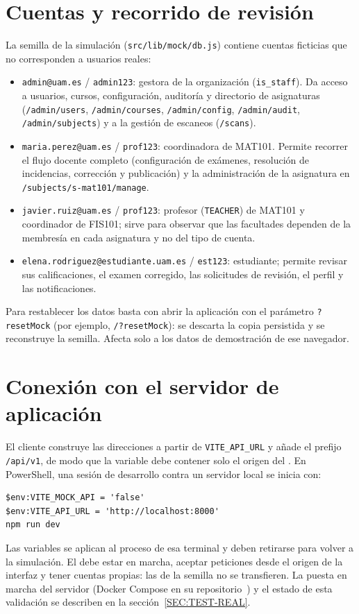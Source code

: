 \section*{Cuentas y recorrido de revisión}
La semilla de la simulación (\texttt{src/lib/mock/db.js}) contiene cuentas
ficticias que no corresponden a usuarios reales:
\begin{itemize}
  \item \texttt{admin@uam.es} / \texttt{admin123}: gestora de la organización
        (\texttt{is\_staff}). Da acceso a usuarios, cursos, configuración,
        auditoría y directorio de asignaturas (\texttt{/admin/users},
        \texttt{/admin/courses}, \texttt{/admin/config}, \texttt{/admin/audit},
        \texttt{/admin/subjects}) y a la gestión de escaneos (\texttt{/scans}).
  \item \texttt{maria.perez@uam.es} / \texttt{prof123}: coordinadora de
        MAT101. Permite recorrer el flujo docente completo (configuración de
        exámenes, resolución de incidencias, corrección y publicación) y la
        administración de la asignatura en \texttt{/subjects/s-mat101/manage}.
  \item \texttt{javier.ruiz@uam.es} / \texttt{prof123}: profesor
        (\texttt{TEACHER}) de MAT101 y coordinador de FIS101; sirve para
        observar que las facultades dependen de la membresía en cada
        asignatura y no del tipo de cuenta.
  \item \texttt{elena.rodriguez@estudiante.uam.es} / \texttt{est123}:
        estudiante; permite revisar sus calificaciones, el examen corregido,
        las solicitudes de revisión, el perfil y las notificaciones.
\end{itemize}

Para restablecer los datos basta con abrir la aplicación con el parámetro
\texttt{?resetMock} (por ejemplo, \texttt{/?resetMock}): se descarta la copia
persistida y se reconstruye la semilla. Afecta solo a los datos de
demostración de ese navegador.

\section*{Conexión con el servidor de aplicación}
El cliente construye las direcciones a partir de \texttt{VITE\_API\_URL} y
añade el prefijo \texttt{/api/v1}, de modo que la variable debe contener solo
el origen del . En PowerShell, una sesión de desarrollo contra un
servidor local se inicia con:
\begin{verbatim}
$env:VITE_MOCK_API = 'false'
$env:VITE_API_URL = 'http://localhost:8000'
npm run dev
\end{verbatim}
Las variables se aplican al proceso de esa terminal y deben retirarse para
volver a la simulación. El  debe estar en marcha, aceptar
peticiones desde el origen de la interfaz y tener cuentas propias: las de la
semilla no se transfieren. La puesta en marcha del servidor (Docker Compose
en su repositorio~\cite{scdee_backend_repo}) y el estado de esta validación se
describen en la sección~\ref{SEC:TEST-REAL}.

